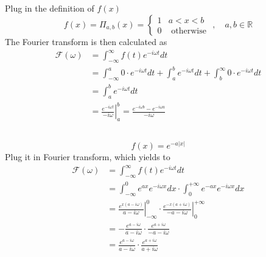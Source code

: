 \documentclass{article}
\begin{document}
\subsection{}
Plug in the definition of $f(x)$
\[
	f(x)= \Pi_{a, b}(x)=\left\{\begin{array}{ll}{1} & {a<x<b} \\ {0} & {\text { otherwise }}\end{array}\right., \quad a, b \in \mathbb{R}
\]
The Fourier transform is then calculated as 
\begin{align*}
	\mathcal{F}(\omega)&=\int_{-\infty}^{\infty} f(t) e^{-i \omega t} d t \\ 
	&=\int_{-\infty}^{a} 0\cdot  e^{-i \omega t} d t +\int_{a}^{b} e^{-i \omega t} d t +\int_{b}^{\infty} 0\cdot  e^{-i \omega t} d t \\
	&= \int_{a}^{b} e^{-i \omega t} d t  \\
	&= \left. \frac{e^{-i \omega t}}{-i \omega} \right|_a^b = \frac{e^{-i \omega b}-e^{-i \omega a}}{-i \omega}
\end{align*}
\subsection{}
\[
	f(x) = e^{-a|x|}
\]
Plug it in Fourier transform, which yields to 
\begin{align*}
	\mathcal{F}(\omega)&=\int_{-\infty}^{\infty} f(t) e^{-i \omega t} d t \\ 
	&= \int_{-\infty}^0 e^{ax}  e^{-i \omega x} dx \cdot \int_0^{+\infty} e^{-ax}  e^{-i \omega x} dx \\
	&= \left.\frac{e^{x(a- i \omega)}}{a- i \omega} \right|_{-\infty}^0 \cdot \left.\frac{e^{-x (a+ i \omega)}}{-a - i \omega} \right|_0^{+\infty} \\
	& = -\frac{e^{a - i \omega}}{a- i \omega}\cdot \frac{e^{a + i \omega}}{-a- i \omega}\\
	&= \frac{e^{a - i \omega}}{a- i \omega}\cdot \frac{e^{a + i \omega}}{a+ i \omega}
\end{align*}
\end{document}
